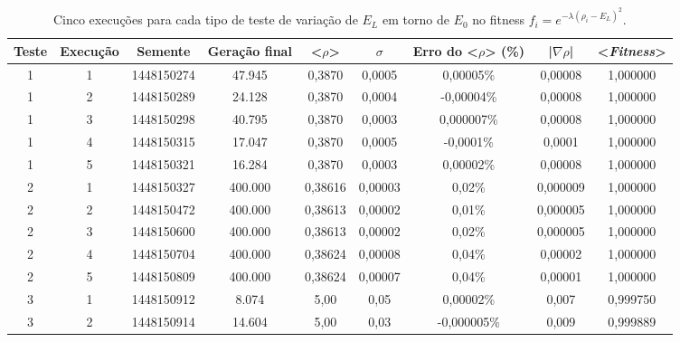 \begin{landscape}
\begin{center}	
\begin{table}[htbp]
\caption{Cinco execuções para cada tipo de teste de variação de $E_L$ em torno de $E_0$ no fitness $f_i = e^{-\lambda(\rho_i - E_L)^2}$.}
\label{tab:VariandoELCincoExecucoes}
\centering
\begin{tabular}{ccccccccc}
\hline \hline
\textbf{Teste} & \textbf{Execução} & \textbf{Semente} & \textbf{Geração final} & \textbf{<$\rho$>} & \textbf{$\sigma$} & \textbf{Erro do <$\rho$> (\%)} & \textbf{|$\nabla \rho$|} & \textbf{<\emph{Fitness}>} \\
\hline \hline
         1 &          1 & 1448150274 &     47.945 &     0,3870 &     0,0005 &  0,00005\% &    0,00008 &   1,000000 \\
\hline
         1 &          2 & 1448150289 &     24.128 &     0,3870 &     0,0004 & -0,00004\% &    0,00008 &   1,000000 \\
\hline
         1 &          3 & 1448150298 &     40.795 &     0,3870 &     0,0003 & 0,000007\% &    0,00008 &   1,000000 \\
\hline
         1 &          4 & 1448150315 &     17.047 &     0,3870 &     0,0005 &  -0,0001\% &     0,0001 &   1,000000 \\
\hline
         1 &          5 & 1448150321 &     16.284 &     0,3870 &     0,0003 &  0,00002\% &    0,00008 &   1,000000 \\
\hline \hline
         2 &          1 & 1448150327 &    400.000 &    0,38616 &    0,00003 &     0,02\% &   0,000009 &   1,000000 \\
\hline
         2 &          2 & 1448150472 &    400.000 &    0,38613 &    0,00002 &     0,01\% &   0,000005 &   1,000000 \\
\hline
         2 &          3 & 1448150600 &    400.000 &    0,38613 &    0,00002 &     0,02\% &   0,000005 &   1,000000 \\
\hline
         2 &          4 & 1448150704 &    400.000 &    0,38624 &    0,00008 &     0,04\% &    0,00002 &   1,000000 \\
\hline
         2 &          5 & 1448150809 &    400.000 &    0,38624 &    0,00007 &     0,04\% &    0,00001 &   1,000000 \\
\hline \hline
         3 &          1 & 1448150912 &      8.074 &       5,00 &       0,05 &  0,00002\% &      0,007 &   0,999750 \\
\hline
         3 &          2 & 1448150914 &     14.604 &       5,00 &       0,03 & -0,000005\% &      0,009 &   0,999889 \\

\end{tabular}
\end{table}
\end{center}
\end{landscape}
